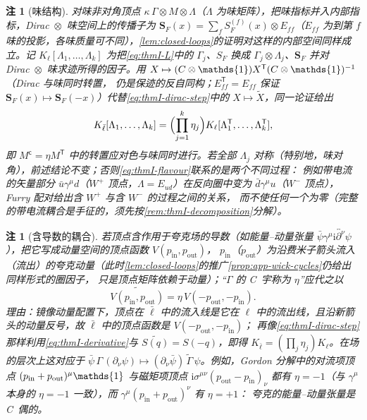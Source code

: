 \documentclass[UTF8,a4paper,11pt,fontset=fandol]{ctexart}
\let\amsmathbb\mathbb
\renewcommand{\mathbb}[1]{\ifx1#1\mathds{1}\else\amsmathbb{#1}\fi}
\theoremstyle{cplain}
\theoremstyle{cdefinition}
\theoremstyle{cremark}
\newtheorem{remark}[theorem]{注}
\numberwithin{equation}{section}
\newcommand{\tp}{\mathsf{T}}                         %
\newcommand{\SF}{S_{F}}                              %
\newcommand{\ii}{\mathrm{i}}                        %
\newcommand{\Cconj}[1]{\widetilde{#1}}              %
\begin{document}
\begin{remark}[味结构]\label{rem:thmI-flavour}
对味非对角顶点 $\kappa\,\Gamma\otimes M\otimes\Lambda$（$\Lambda$ 为味矩阵），把味指标并入内部指标，Dirac~$\otimes$~味空间上的传播子为 $\mathbf S_F(x)=\sum_f\SF^{(f)}(x)\otimes E_{ff}$（$E_{ff}$ 为到第 $f$ 味的投影，各味质量可不同），\cref{lem:closed-loops}的证明对这样的内部空间同样成立。记 $K_\ell[\Lambda_1,\dots,\Lambda_k]$ 为把\cref{eq:thmI-L}中的
$\Gamma_j$、$\SF$ 换成 $\Gamma_j\otimes\Lambda_j$、$\mathbf S_F$ 并对 Dirac~$\otimes$~味求迹所得的因子。用 $X\mapsto(C\otimes\mathbb 1)X^{\tp}(C\otimes\mathbb 1)^{-1}$（Dirac 与味同时转置，
仍是保迹的反自同构；$E_{ff}^{\tp}=E_{ff}$ 保证 $\mathbf S_F(x)\mapsto\mathbf S_F(-x)$）代替\cref{eq:thmI-dirac-step}中的 $X\mapsto\Cconj X$，同一论证给出
\begin{equation}\label{eq:thmI-flavour}
K_{\bar\ell}[\Lambda_1,\dots,\Lambda_k]=\Bigl(\prod_{j=1}^k\eta_j\Bigr)K_\ell[\Lambda_1^{\tp},\dots,\Lambda_k^{\tp}] ,
\end{equation}
即 $M^{\mathsf c}=\eta M^{\tp}$ 中的转置应对色与味\emph{同时}进行。若全部 $\Lambda_j$ 对称（特别地，味对角），前述结论不变；否则\cref{eq:thmI-flavour}联系的是\emph{两个不同过程}：
例如带电流的矢量部分 $\bar u\gamma^\mu d$（$W^+$ 顶点，$\Lambda=E_{ud}$）在反向圈中变为 $\bar d\gamma^\mu u$（$W^-$ 顶点），Furry 配对给出含 $W^+$ 与含 $W^-$ 的过程之间的关系，
而不使任何一个为零（完整的带电流耦合是手征的，须先按\cref{rem:thmI-decomposition}分解）。
\end{remark}

\begin{remark}[含导数的耦合]\label{rem:thmI-derivative}
若顶点含作用于夸克场的导数（如能量--动量张量 $\bar\psi\gamma^\mu\ii\overleftrightarrow{\partial^\nu}\psi$），把它写成动量空间的顶点函数 $V(p_{\mathrm{in}},p_{\mathrm{out}})$，
$p_{\mathrm{in}}$（$p_{\mathrm{out}}$）为沿费米子箭头流入（流出）的夸克动量（此时\cref{lem:closed-loops}的推广\cref{prop:app-wick-cycles}仍给出同样形式的圈因子，
只是顶点矩阵依赖于动量）；“$\Gamma$ 的 C~宇称为 $\eta$”应代之以
\begin{equation}\label{eq:thmI-derivative}
\Cconj{V(p_{\mathrm{in}},p_{\mathrm{out}})}=\eta\,V(-p_{\mathrm{out}},-p_{\mathrm{in}}) .
\end{equation}
理由：镜像动量配置下，顶点在 $\bar\ell$ 中的流入线是它在 $\ell$ 中的流出线，且沿新箭头的动量反号，故 $\bar\ell$ 中的顶点函数是 $V(-p_{\mathrm{out}},-p_{\mathrm{in}})$；
再像\cref{eq:thmI-dirac-step}那样利用\cref{eq:thmI-derivative}与 $\Cconj{S(q)}=S(-q)$，即得 $K_{\bar\ell}=(\prod_j\eta_j)K_\ell$。在场的层次上这对应于
$\bar\psi\,\Gamma\,(\partial_\nu\psi)\mapsto(\partial_\nu\bar\psi)\,\Cconj\Gamma\,\psi$。例如，Gordon 分解中的对流项顶点 $(p_{\mathrm{in}}+p_{\mathrm{out}})^\mu\mathbb 1$ 与磁矩项顶点
$\ii\sigma^{\mu\nu}(p_{\mathrm{out}}-p_{\mathrm{in}})_\nu$ 都有 $\eta=-1$（与 $\gamma^\mu$ 本身的 $\eta=-1$ 一致），而 $\gamma^\mu(p_{\mathrm{in}}+p_{\mathrm{out}})^\nu$ 有 $\eta=+1$：
夸克的能量--动量张量是 C~偶的。
\end{remark}
\end{document}
